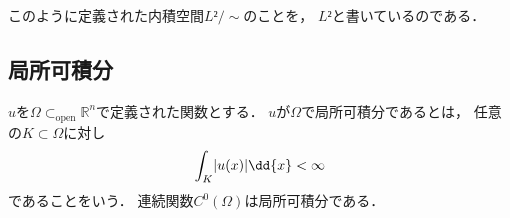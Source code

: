 \documentclass[../sotsu.tex]{subfiles}
\begin{document}
このように定義された内積空間$L²/{\sim}$のことを，
$L²$と書いているのである．




\subsection{局所可積分}

$u$を$𝛺 \subset_{\text{open}} ℝ^n$で定義された関数とする．
$u$が$𝛺$で局所可積分であるとは，
任意の$K \subset 𝛺$に対し
\begin{equation*}
    \int_K \abs{ u(x) } \dd{x} < \infty
\end{equation*}
であることをいう．
連続関数$C^0 (𝛺)$は局所可積分である．
\end{document}
